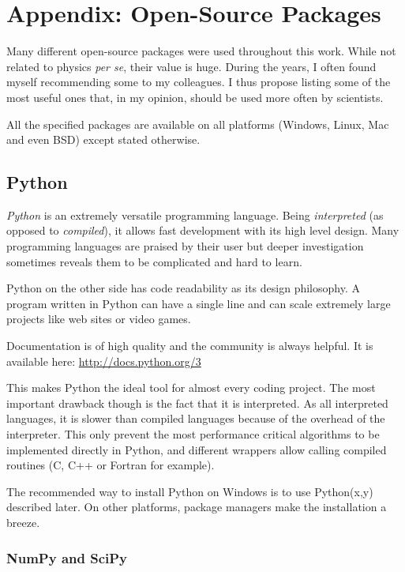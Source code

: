 \section{Appendix: Open-Source Packages}
\label{appendix:oss}

Many different open-source packages were used throughout this work. While not
related to physics \textit{per se}, their value is huge. During the years, I
often found myself recommending some to my colleagues. I thus propose listing
some of the most useful ones that, in my opinion, should be used more often
by scientists.

All the specified packages are available on all platforms (Windows, Linux, Mac
and even BSD) except stated otherwise.


\subsection*{Python}

\textit{Python} is an extremely versatile programming language. Being \textit{interpreted}
(as opposed to \textit{compiled}), it allows fast development with its high
level design. Many programming languages are praised by their user but deeper
investigation sometimes reveals them to be complicated and hard to learn.

Python on the other side has code readability as its design philosophy.
A program written in Python can have a single line and can scale extremely
large projects like web sites or video games.

Documentation is of high quality and the community is always helpful. It is
available here: \url{http://docs.python.org/3}

This makes Python the ideal tool for almost every coding project. The most
important drawback though is the fact that it is interpreted. As all interpreted
languages, it is slower than compiled languages because of the overhead of the
interpreter. This only prevent the most performance critical algorithms to be
implemented directly in Python, and different wrappers allow calling compiled
routines (C, C++ or Fortran for example).

The recommended way to install Python on Windows is to use Python(x,y) described
later. On other platforms, package managers make the installation a breeze.


\subsubsection*{NumPy and SciPy}


